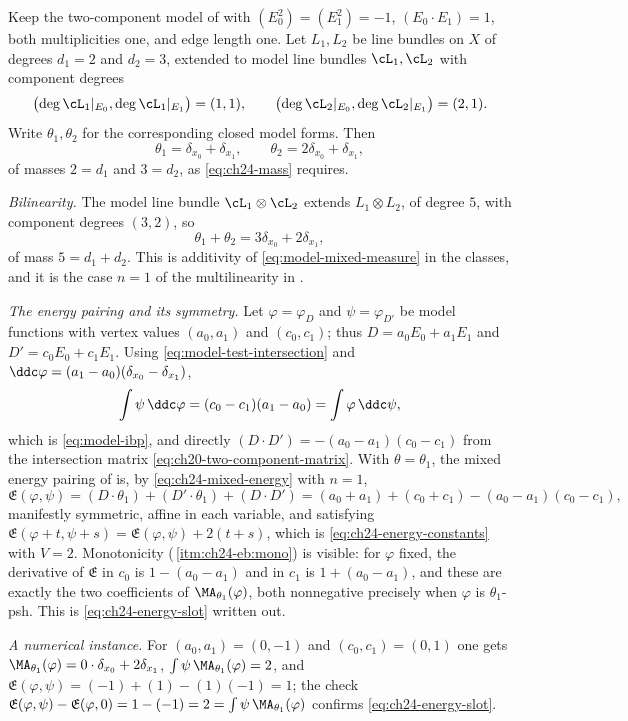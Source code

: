 \begin{example}
\label{ex:ch24-curve-mixed}
Keep the two-component model of  with
$(E_0^2)=(E_1^2)=-1$, $(E_0\cdot E_1)=1$, both multiplicities one, and
edge length one.  Let $L_1,L_2$ be line bundles on $X$ of degrees
$d_1=2$ and $d_2=3$, extended to model line bundles
$\cL_1,\cL_2$ with component degrees
\[
 \bigl(\deg\cL_1|_{E_0},\deg\cL_1|_{E_1}\bigr)=(1,1),
 \qquad
 \bigl(\deg\cL_2|_{E_0},\deg\cL_2|_{E_1}\bigr)=(2,1).
\]
Write $\theta_1,\theta_2$ for the corresponding closed model forms.  Then
\[
 \theta_1=\delta_{x_0}+\delta_{x_1},
 \qquad
 \theta_2=2\delta_{x_0}+\delta_{x_1},
\]
of masses $2=d_1$ and $3=d_2$, as \eqref{eq:ch24-mass} requires.

\emph{Bilinearity.}  The model line bundle $\cL_1\otimes\cL_2$ extends
$L_1\otimes L_2$, of degree $5$, with component degrees $(3,2)$, so
\[
 \theta_1+\theta_2=3\delta_{x_0}+2\delta_{x_1},
\]
of mass $5=d_1+d_2$.  This is additivity of
\eqref{eq:model-mixed-measure} in the classes, and it is the case $n=1$ of
the multilinearity in .

\emph{The energy pairing and its symmetry.}  Let $\varphi=\varphi_D$ and
$\psi=\varphi_{D'}$ be model functions with vertex values $(a_0,a_1)$ and
$(c_0,c_1)$; thus $D=a_0E_0+a_1E_1$ and $D'=c_0E_0+c_1E_1$.  Using
\eqref{eq:model-test-intersection} and
$\ddc\varphi=(a_1-a_0)(\delta_{x_0}-\delta_{x_1})$,
\[
 \int\psi\,\ddc\varphi
 =(c_0-c_1)(a_1-a_0)
 =\int\varphi\,\ddc\psi ,
\]
which is \eqref{eq:model-ibp}, and directly
$(D\cdot D')=-(a_0-a_1)(c_0-c_1)$ from the intersection matrix
\eqref{eq:ch20-two-component-matrix}.  With $\theta=\theta_1$, the mixed
energy pairing of  is, by
\eqref{eq:ch24-mixed-energy} with $n=1$,
\[
 \mathfrak E(\varphi,\psi)
 =(D\cdot\theta_1)+(D'\cdot\theta_1)+(D\cdot D')
 =(a_0+a_1)+(c_0+c_1)-(a_0-a_1)(c_0-c_1),
\]
manifestly symmetric, affine in each variable, and satisfying
$\mathfrak E(\varphi+t,\psi+s)=\mathfrak E(\varphi,\psi)+2(t+s)$, which is
\eqref{eq:ch24-energy-constants} with $V=2$.  Monotonicity
(\,\cref{itm:ch24-eb:mono}) is visible: for
$\varphi$ fixed, the derivative of $\mathfrak E$ in $c_0$ is
$1-(a_0-a_1)$ and in $c_1$ is $1+(a_0-a_1)$, and these are exactly the
two coefficients of $\MA_{\theta_1}(\varphi)$, both nonnegative precisely
when $\varphi$ is $\theta_1$-psh.  This is
\eqref{eq:ch24-energy-slot} written out.

\emph{A numerical instance.}  For $(a_0,a_1)=(0,-1)$ and
$(c_0,c_1)=(0,1)$ one gets
$\MA_{\theta_1}(\varphi)=0\cdot\delta_{x_0}+2\delta_{x_1}$,
$\int\psi\,\MA_{\theta_1}(\varphi)=2$, and
$\mathfrak E(\varphi,\psi)=(-1)+(1)-(1)(-1)=1$; the check
$\mathfrak E(\varphi,\psi)-\mathfrak E(\varphi,0)
 =1-(-1)=2=\int\psi\,\MA_{\theta_1}(\varphi)$ confirms
\eqref{eq:ch24-energy-slot}.
\end{example}

